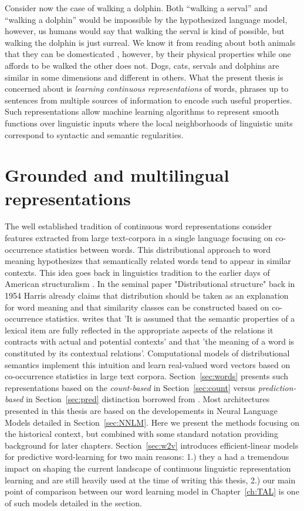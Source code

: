 Consider now the case of walking a dolphin.
Both ``walking a serval'' and ``walking a dolphin'' would be impossible
by the hypothesized language model, however, us humans would say that walking the serval is
kind of possible, but walking the dolphin is just surreal.
We know it from reading about both animals that they can be domesticated
, however, by their physical properties while one affords to be walked
the other does not. Dogs, cats, servals and dolphins are similar in some
dimensions and different in others.
What the present thesis is concerned about is
\emph{learning continuous representations} of words, phrases up to sentences
from multiple sources of information to encode such useful properties.
Such representations allow machine learning algorithms to represent smooth
functions over linguistic inputs where the local neighborhoods of linguistic
units correspond to syntactic and semantic regularities.

\section{Grounded and multilingual representations}
The well established tradition of continuous word representations consider
features extracted from large text-corpora in a single language focusing on
co-occurrence statistics between words. 
This distributional approach to word meaning hypothesizes that semantically related words
tend to appear in similar contexts. This idea goes back in linguistics tradition to the
earlier days of American structuralism \citep{nevin2002legacy}. In the seminal paper
"Distributional structure" \citep{harris1954distributional} back in 1954 Harris already claims
that distribution should be taken as an explanation for word meaning and that similarity classes
can be constructed based on co-occurrence statistics.
\cite{cruse1986lexical} writes that 'It is  assumed  that  the  semantic properties  of
a lexical  item  are  fully  reflected  in  the  appropriate  aspects  of  the  relations
it  contracts  with  actual  and  potential  contexts' and that 'the  meaning  of  a word
is constituted  by  its  contextual  relations'. Computational models of distributional
semantics implement this intuition and learn real-valued word vectors based on co-occurrence
statistics in large text corpora. Section~\ref{sec:words} presents 
such representations based on the \emph{count-based} in Section~\ref{sec:count}
versus \emph{prediction-based} in Section~\ref{sec:pred}
distinction borrowed from \cite{baroni2014don}. Most architectures presented  
in this thesis are based on the developements in Neural Language Models detailed
in Section~\ref{sec:NNLM}. Here we present the methods focusing on the historical context,
but combined with some standard notation
providing background for later chapters. Section~\ref{sec:w2v} introduces efficient-linear 
models for predictive word-learning for two main reasons: 1.) they a had a tremendous impact
on shaping the current landscape of continuous linguistic representation learning and are still
heavily used at the time of writing this thesis, 2.) our main point of comparison between
our word learning model in Chapter~\ref{ch:TAL} is one of such models detailed in the section.


